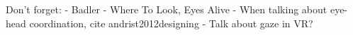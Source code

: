 
Don't forget:
- Badler - Where To Look, Eyes Alive
- When talking about eye-head coordination, cite andrist2012designing
- Talk about gaze in VR?

